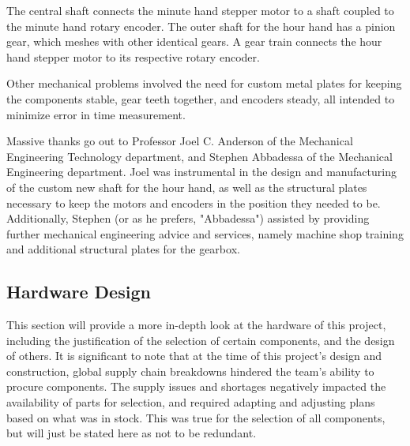 \documentclass[11pt]{article}
\begin{document}
The central shaft connects the minute hand stepper motor to a shaft coupled to the minute hand rotary encoder. 
The outer shaft for the hour hand has a pinion gear, which meshes with other identical gears.  
A gear train connects the hour hand stepper motor to its respective rotary encoder.

Other mechanical problems involved the need for custom metal plates for keeping the components stable, gear teeth together, and encoders steady, all intended to minimize error in time measurement.

Massive thanks go out to Professor Joel C. Anderson of the Mechanical Engineering Technology department, and Stephen Abbadessa of the Mechanical Engineering department. 
Joel was instrumental in the design and manufacturing of the custom new shaft for the hour hand, as well as the structural plates necessary to keep the motors and encoders in the position they needed to be. 
Additionally, Stephen (or as he prefers, "Abbadessa") assisted by providing further mechanical engineering advice and services, namely machine shop training and additional structural plates for the gearbox.



\subsection{Hardware Design}
\label{HWDesign}

This section will provide a more in-depth look at the hardware of this project, including the justification of the selection of certain components, and the design of others. 
It is significant to note that at the time of this project's design and construction, global supply chain breakdowns hindered the team's ability to procure components.
The supply issues and shortages negatively impacted the availability of parts for selection, and required adapting and adjusting plans based on what was in stock. 
This was true for the selection of all components, but will just be stated here as not to be redundant. 
\end{document}
